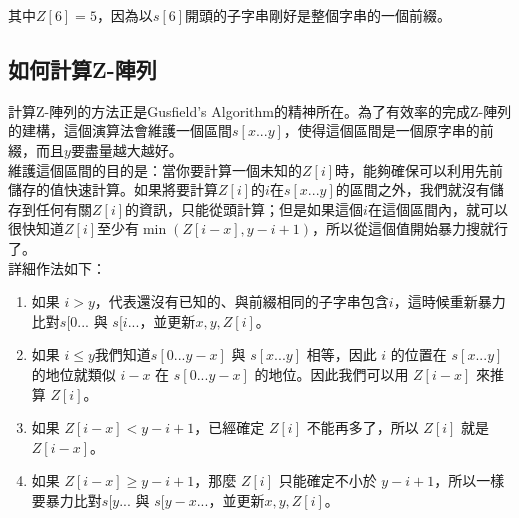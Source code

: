 \begin{center}
\end{center}

其中$Z[6]=5$，因為以$s[6]$開頭的子字串剛好是整個字串的一個前綴。\\

\subsection{如何計算Z-陣列}

計算Z-陣列的方法正是Gusfield's Algorithm的精神所在。為了有效率的完成Z-陣列的建構，這個演算法會維護一個區間$s[x...y]$，使得這個區間是一個原字串的前綴，而且$y$要盡量越大越好。\\

維護這個區間的目的是：當你要計算一個未知的$Z[i]$時，能夠確保可以利用先前儲存的值快速計算。如果將要計算$Z[i]$的$i$在$s[x...y]$的區間之外，我們就沒有儲存到任何有關$Z[i]$的資訊，只能從頭計算；但是如果這個$i$在這個區間內，就可以很快知道$Z[i]$至少有$\min(Z[i-x], y-i+1)$，所以從這個值開始暴力搜就行了。\\

詳細作法如下：
\begin{enumerate}
\item 如果 $i>y$，代表還沒有已知的、與前綴相同的子字串包含$i$，這時候重新暴力比對$s[0...$ 與 $s[i...$，並更新$x, y, Z[i]$。
\item 如果 $i\leq y$我們知道$s[0...y-x]$ 與 $s[x...y]$ 相等，因此 $i$ 的位置在 $s[x...y]$ 的地位就類似 $i-x$ 在 $s[0...y-x]$ 的地位。因此我們可以用 $Z[i-x]$ 來推算 $Z[i]$。
\item 如果 $Z[i-x] < y-i+1$，已經確定 $Z[i]$ 不能再多了，所以 $Z[i]$ 就是 $Z[i-x]$。
\item 如果 $Z[i-x] \geq y-i+1$，那麼 $Z[i]$ 只能確定不小於 $y-i+1$，所以一樣要暴力比對$s[y...$ 與 $s[y-x...$，並更新$x, y, Z[i]$。
\end{enumerate}

